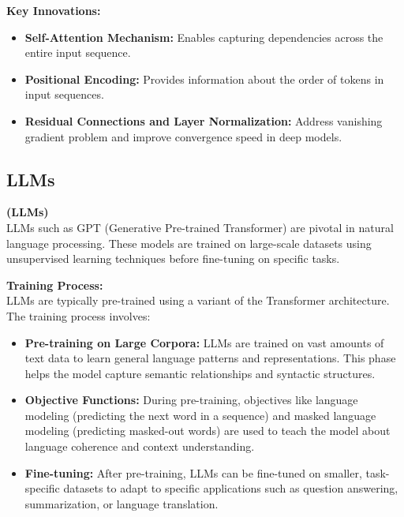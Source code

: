 \hfill \break
\textbf{Key Innovations:}

\begin{itemize}
    \item \textbf{Self-Attention Mechanism:} Enables capturing dependencies across the entire input sequence.
    
    \item \textbf{Positional Encoding:} Provides information about the order of tokens in input sequences.
    
    \item \textbf{Residual Connections and Layer Normalization:} Address vanishing gradient problem and improve convergence speed in deep models.
\end{itemize}

\newpage


\subsection{LLMs}

\hfill \break
\textbf{ (LLMs)} \\

LLMs such as GPT (Generative Pre-trained Transformer) are pivotal in natural language processing. These models are trained on large-scale datasets using unsupervised learning techniques before fine-tuning on specific tasks.

\hfill \break
\textbf{Training Process:} \\

LLMs are typically pre-trained using a variant of the Transformer architecture. The training process involves:

\begin{itemize}
    \item \textbf{Pre-training on Large Corpora:} LLMs are trained on vast amounts of text data to learn general language patterns and representations. This phase helps the model capture semantic relationships and syntactic structures.
    
    \item \textbf{Objective Functions:} During pre-training, objectives like language modeling (predicting the next word in a sequence) and masked language modeling (predicting masked-out words) are used to teach the model about language coherence and context understanding.
    
    \item \textbf{Fine-tuning:} After pre-training, LLMs can be fine-tuned on smaller, task-specific datasets to adapt to specific applications such as question answering, summarization, or language translation.
\end{itemize}

